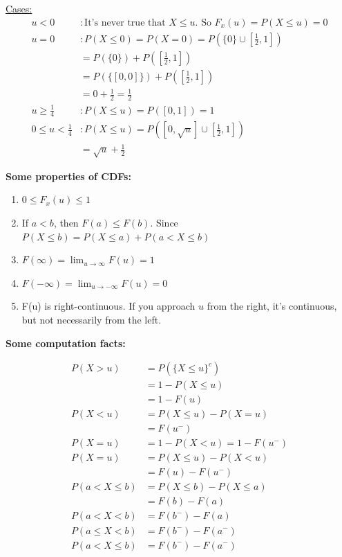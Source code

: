 \documentclass[10pt]{article}
\begin{document}
\begin{flushleft}
\begin{itemize}
        \underline{Cases:}
        $$ \begin{aligned}
            u < 0 &: \text{It's never true that } X \leq u. \text{ So } F_x(u) = P(X
                \leq u) = 0 \\
            u = 0 &: P(X \leq 0) = P(X = 0) = P(\{ 0 \} \cup [ \frac{1}{2}, 1])
                \\
                  &= P(\{ 0 \}) + P( [ \frac{1}{2}, 1] ) \\
                  &= P(\{ [ 0, 0 ] \}) + P( [ \frac{1}{2}, 1] ) \\
                  &= 0 + \frac{1}{2} = \frac{1}{2} \\
            u \geq \frac{1}{4} &: P(X \leq u) = P([0,1]) = 1 \\
            0 \leq u < \frac{1}{4} &: P(X \leq u) = P([0, \sqrt{u}] \cup
            [\frac{1}{2}, 1]) \\
                                   &= \sqrt{u} + \frac{1}{2}
        \end{aligned} $$
\end{itemize}

\textbf{Some properties of CDFs:}
\begin{enumerate}
    \item $0 \leq F_x(u) \leq 1$
    \item If $a < b$, then $F(a) \leq F(b)$. Since $P(X \leq b) = P(X \leq a) +
        P(a < X \leq b)$ 
    \item $F(\infty) = \lim_{u \to \infty} F(u) = 1$
    \item $F(-\infty) = \lim_{u \to -\infty} F(u) = 0$
    \item F(u) is right-continuous. If you approach $u$ from the right, it's
        continuous, but not necessarily from the left.
\end{enumerate}

\textbf{Some computation facts:}

     $$ \begin{aligned}
            P(X > u) &= P(\{X \leq u\}^c) \\
            &= 1 - P(X \leq u) \\
            &= 1 - F(u) \\
            P(X < u) &= P(X \leq u) - P(X = u) \\
            &= F(u^-) \\
            P(X = u) &= 1 - P(X < u) = 1 - F(u^-) \\
            P(X = u) &= P(X \leq u) - P(X < u) \\
            &= F(u) - F(u^-) \\
            P(a < X \leq b) &= P(X \leq b) - P(X \leq a) \\
            &= F(b) - F(a) \\
            P(a < X < b) &= F(b^-) - F(a) \\
            P(a \leq X < b) &= F(b^-) - F(a^-) \\
            P(a < X \leq b) &= F(b^-) - F(a^-) \\
        \end{aligned} $$


\end{flushleft}
\end{document}
